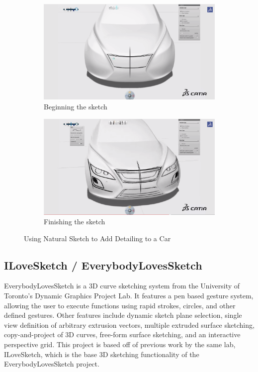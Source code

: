 \documentclass[12pt]{report}
\begin{document}
\begin{figure}

\begin{subfigure}{\textwidth}
\includegraphics[width=\textwidth]{CATIA1}
\caption{Beginning the sketch}
\end{subfigure}
\begin{subfigure}{\textwidth}
\includegraphics[width=\textwidth]{CATIA2}
\caption{Finishing the sketch}
\end{subfigure}

\caption{Using Natural Sketch to Add Detailing to a Car}
\end{figure}


\subsection{ILoveSketch / EverybodyLovesSketch}

EverybodyLovesSketch is a 3D curve sketching system from the University of Toronto's Dynamic Graphics Project Lab. It features a pen based gesture system, allowing the user to execute functions using rapid strokes, circles, and other defined gestures. Other features include dynamic sketch plane selection, single view definition of arbitrary extrusion vectors, multiple extruded surface sketching, copy-and-project of 3D curves, free-form surface sketching, and an interactive perspective grid. This project is based off of previous work by the same lab, ILoveSketch, which is the base 3D sketching functionality of the EverybodyLovesSketch project.
\end{document}
